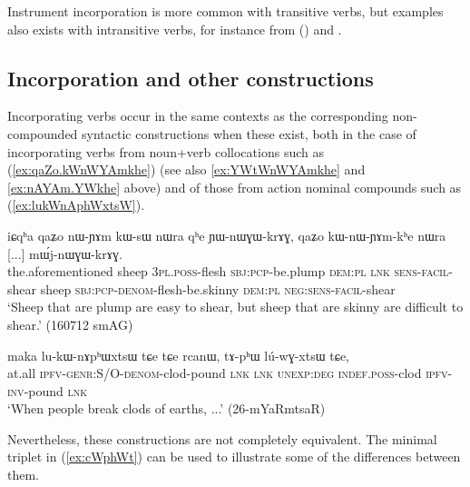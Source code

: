 Instrument incorporation is more common with transitive verbs, but examples also exists with intransitive verbs, for instance  from  () and .


\subsection{Incorporation and other constructions} \label{sec:incorp.vs.other}
Incorporating verbs occur in the same contexts as the corresponding non-com\-poun\-ded syntactic constructions when these exist, both in the case of incorporating verbs from noun+verb collocations such as  (\ref{ex:qaZo.kWnWYAmkhe}) (see also \ref{ex:YWtWnWYAmkhe} and \ref{ex:nAYAm.YWkhe} above) and of those from action nominal compounds such as  (\ref{ex:lukWnAphWxtsW}).

\begin{exe}
\ex \label{ex:qaZo.kWnWYAmkhe}
\gll iɕqʰa qaʑo nɯ-ɲɤm kɯ-sɯ nɯra qʰe ɲɯ-nɯɣɯ-krɤɣ, qaʑo kɯ-nɯ-ɲɤm-kʰe nɯra [...] mɯ́j-nɯɣɯ-krɤɣ. \\
the.aforementioned sheep \textsc{3pl}.\textsc{poss}-flesh \textsc{sbj}:\textsc{pcp}-be.plump \textsc{dem}:\textsc{pl} \textsc{lnk} \textsc{sens}-\textsc{facil}-shear sheep \textsc{sbj}:\textsc{pcp}-\textsc{denom}-flesh-be.skinny \textsc{dem}:\textsc{pl} {  } \textsc{neg}:\textsc{sens}-\textsc{facil}-shear \\
\glt `Sheep that are plump are easy to shear, but sheep that are skinny are difficult to shear.' (160712 smAG)
\end{exe}

\begin{exe}
\ex \label{ex:lukWnAphWxtsW}
\gll maka lu-kɯ-nɤpʰɯxtsɯ tɕe tɕe rcanɯ, tɤ-pʰɯ lú-wɣ-xtsɯ tɕe, \\
at.all \textsc{ipfv}-\textsc{genr}:S/O-\textsc{denom}-clod-pound \textsc{lnk} \textsc{lnk} \textsc{unexp}:\textsc{deg} \textsc{indef}.\textsc{poss}-clod \textsc{ipfv}-\textsc{inv}-pound \textsc{lnk} \\
\glt `When people break clods of earths, ...' (26-mYaRmtsaR)
\end{exe}

Nevertheless, these constructions are not completely equivalent. The minimal triplet in (\ref{ex:cWphWt}) can be used to illustrate some of the differences between them.

